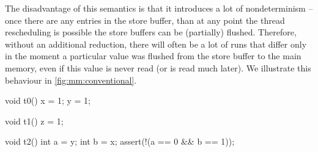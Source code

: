 The disadvantage of this semantics is that it introduces a lot of
nondeterminism -- once there are any entries in the store buffer, than at any
point the thread rescheduling is possible the store buffers can be (partially)
flushed.
Therefore, without an additional reduction, there will often be a lot of runs
that differ only in the moment a particular value was flushed from the store
buffer to the main memory, even if this value is never read (or is read much
later).
We illustrate this behaviour in \autoref{fig:mm:conventional}.

\begin{widefigure}
  \begin{multicols}{2}
    \begin{multicols}{2}
      \begin{cppcodeln}
        void t0() {
          x = 1;
          y = 1;
        }
      \end{cppcodeln}
      \columnbreak
      \begin{cppcodeln}
        void t1() {
          z = 1;
        }
      \end{cppcodeln}
    \end{multicols}
    \columnbreak
    \begin{cppcodeln}
      void t2() {
        int a = y;
        int b = x;
        assert(!(a == 0 && b == 1));
      }
    \end{cppcodeln}
  \end{multicols}
  \scriptsize
  \newcommand{\be}[2]{\texttt{#1} ← \texttt{#2}}
  \newcommand{\pc}[2]{$\texttt{PC}_\texttt{t#1}$\texttt{ = #2}}
\end{widefigure}
